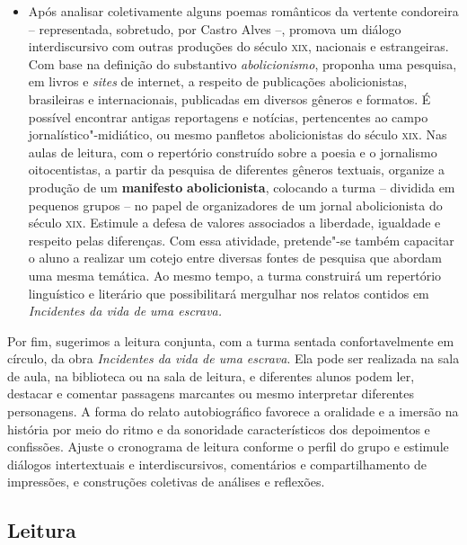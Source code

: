 \documentclass[12pt]{extarticle}
\begin{document}
\begin{itemize}
\item
  Após analisar coletivamente alguns poemas românticos da vertente
  condoreira -- representada, sobretudo, por Castro Alves --, promova um
  diálogo interdiscursivo com outras produções do século \textsc{xix}, nacionais
  e estrangeiras. Com base na definição do substantivo
  \emph{abolicionismo}, proponha uma pesquisa, em livros e \emph{sites}
  de internet, a respeito de publicações abolicionistas, brasileiras e
  internacionais, publicadas em diversos gêneros e formatos. É possível
  encontrar antigas reportagens e notícias, pertencentes ao campo
  jornalístico"-midiático, ou mesmo panfletos abolicionistas do século
  \textsc{xix}. Nas aulas de leitura, com o repertório construído sobre a poesia
  e o jornalismo oitocentistas, a partir da pesquisa de diferentes
  gêneros textuais, organize a produção de um \textbf{manifesto}
  \textbf{abolicionista}, colocando a turma -- dividida em pequenos
  grupos -- no papel de organizadores de um jornal abolicionista do
  século \textsc{xix}. Estimule a defesa de valores associados a liberdade,
  igualdade e respeito pelas diferenças. Com essa atividade, pretende"-se
  também capacitar o aluno a realizar um cotejo entre diversas fontes de
  pesquisa que abordam uma mesma temática. Ao mesmo tempo, a turma
  construirá um repertório linguístico e literário que possibilitará
  mergulhar nos relatos contidos em \emph{Incidentes da vida de uma
  escrava.}
\end{itemize}

Por fim, sugerimos a leitura conjunta, com a turma sentada
confortavelmente em círculo, da obra \emph{Incidentes da vida de uma
escrava}. Ela pode ser realizada na sala de aula, na biblioteca ou na
sala de leitura, e diferentes alunos podem ler, destacar e comentar
passagens marcantes ou mesmo interpretar diferentes personagens. A forma
do relato autobiográfico favorece a oralidade e a imersão na história
por meio do ritmo e da sonoridade característicos dos depoimentos e
confissões. Ajuste o cronograma de leitura conforme o perfil do grupo e
estimule diálogos intertextuais e interdiscursivos, comentários e
compartilhamento de impressões, e construções coletivas de análises e
reflexões.

\subsection{Leitura}

\bnccativividadesleitura
\end{document}
